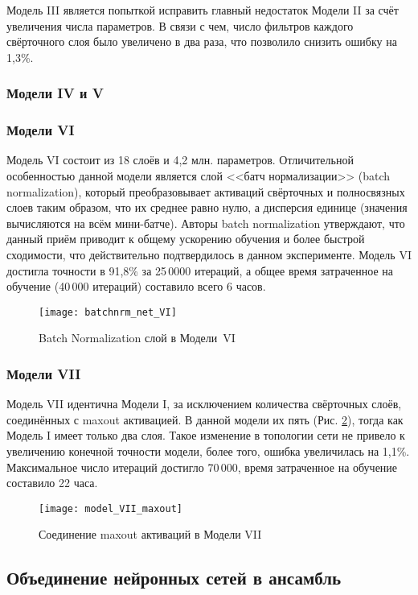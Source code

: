 Модель III является попыткой исправить главный недостаток Модели II за счёт увеличения числа параметров.
В связи с чем, число фильтров каждого свёрточного слоя было увеличено в два раза, что позволило снизить ошибку на 1,3\%.

\subsubsection{Модели IV и V}


\subsubsection{Модели VI}
Модель VI состоит из 18 слоёв и 4,2 млн. параметров. Отличительной особенностью данной модели является слой <<батч нормализации>>
(batch normalization), который преобразовывает активаций свёрточных и полносвязных слоев таким образом, что их среднее равно нулю, а
дисперсия единице (значения вычисляются на всём мини-батче). Авторы batch normalization \cite{DBLP:journals/corr/IoffeS15} утверждают,
что данный приём приводит к общему ускорению обучения и более быстрой сходимости, что действительно подтвердилось в данном эксперименте.
Модель VI достигла точности в 91,8\% за 25\,0000 итераций, а общее время затраченное на обучение (40\,000 итераций) составило всего 6 часов.
\begin{figure}[H]
    \centering
    \texttt{[image: batchnrm\_net\_VI]}
    \caption{Batch Normalization слой в Модели~VI}
    \label{fig:model_VI_bnrm}
\end{figure}

\subsubsection{Модели VII}
Модель VII идентична Модели I, за исключением количества свёрточных слоёв, соединённых с maxout активацией. В данной модели их пять
(Рис. \ref*{fig:model_VII_maxout}), тогда как Модель I имеет только два слоя. Такое изменение в топологии сети не привело к 
увеличению конечной точности модели, более того, ошибка увеличилась на 1,1\%. Максимальное число итераций достигло 70\,000,
время затраченное на обучение составило 22 часа.
\begin{figure}[H]
    \centering
    \texttt{[image: model\_VII\_maxout]}
    \caption{Соединение maxout активаций в Модели VII}
    \label{fig:model_VII_maxout}
\end{figure}
\subsection{Объединение нейронных сетей в ансамбль}